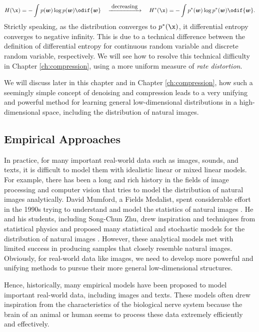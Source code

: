 \documentclass[../../book-main.tex]{subfiles}
\begin{document}
\begin{equation}
H(\x) = - \int p(\boldsymbol{w}) \log p(\boldsymbol{w}) \odif{\boldsymbol{w}}  \quad \xrightarrow{\hspace{1mm} \mbox{decreasing} \hspace{1mm}} \quad H^*(\x) = - \int p^*(\boldsymbol{w}) \log p^*(\boldsymbol{w}) \odif{\boldsymbol{w}}.    
\end{equation}
Strictly speaking, as the distribution converges to $p^*(\x)$, it differential entropy converges to negative infinity. This is due to a technical difference between the definition of differential entropy for continuous random variable and discrete random variable, respectively. We will see how to resolve this technical difficulty in Chapter \ref{ch:compression}, using a more uniform measure of {\em rate distortion}.


We will discuss later in this chapter and in Chapter \ref{ch:compression}, how such a seemingly simple concept of denoising and compression leads to a very unifying and powerful method for learning general low-dimensional distributions in a high-dimensional space, including the distribution of natural images. 

\subsection{Empirical Approaches}
In practice, for many important real-world data such as images, sounds, and texts, it is difficult to model them with idealistic linear or mixed linear models. For example, there has been a long and rich history in the fields of image processing and computer vision that tries to model the distribution of natural images analytically. David Mumford, a Fields Medalist, spent considerable effort in the 1990s trying to understand and model the statistics of natural images \cite{Mumford1996TheSD}. He and his students, including Song-Chun Zhu, drew inspiration and techniques from statistical physics and proposed many statistical and stochastic models for the distribution of natural images \cite{Zhu-Entropy-1997,Zhu1997LearningGP,Zhu1997Prior,Huang-Mumford,Mumford-1999,Lee-Mumford}. However, these analytical models met with limited success in producing samples that closely resemble natural images. Obviously, for real-world data like images, we need to develop more powerful and unifying methods to pursue their more general low-dimensional structures.

Hence, historically, many empirical models  have been proposed to model important real-world data, including images and texts. These models often drew inspiration from the characteristics of the biological nerve system because the brain of an animal or human seems to process these data extremely efficiently and effectively. 
\end{document}

